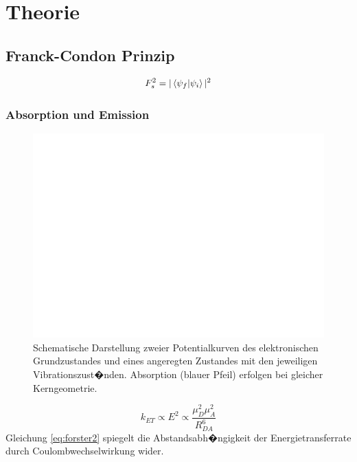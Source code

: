 \chapter{Theorie}

\section{Franck-Condon Prinzip}


 \begin{equation}
 F_{s}^{2}=|\Braket{\psi_{f}}{\psi_{i}}|^{2}
 \label{eq:franck1}
 \end{equation}

 \subsection{Absorption und Emission}
 \begin{figure}
\centering
\includegraphics[width=0.7\linewidth]{figures/Franck}
\caption{Schematische Darstellung zweier Potentialkurven des elektronischen Grundzustandes und eines angeregten Zustandes mit den jeweiligen Vibrationszust�nden. Absorption (blauer Pfeil) erfolgen bei gleicher Kerngeometrie.}
\label{fig:Franck}
\end{figure}
 \begin{equation}
k_{ET} \propto E^{2}\propto \frac{\mu_{D}^{2}\mu_{A}^{2}}{R_{DA}^{6}}
\label{eq:forster2}
 \end{equation}
  Gleichung \ref{eq:forster2} spiegelt die Abstandsabh�ngigkeit der Energietransferrate durch Coulombwechselwirkung wider.\cite{turro:1991}
